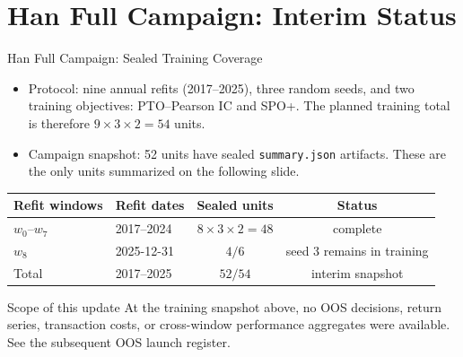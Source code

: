 \documentclass[aspectratio=169,xcolor=dvipsnames]{beamer}
\begin{document}
    

\section{Han Full Campaign: Interim Status}

\begin{frame}
    \tableofcontents[currentsection]
\end{frame}

\begin{frame}{Han Full Campaign: Sealed Training Coverage}
    \small
    \begin{itemize}
        \item Protocol: nine annual refits (2017--2025), three random seeds,
        and two training objectives: PTO--Pearson IC and SPO+.
        The planned training total is therefore $9\times3\times2=54$ units.
        \item Campaign snapshot: 52 units have sealed \texttt{summary.json}
        artifacts. These are the only units summarized on the following slide.
    \end{itemize}
    \vspace{3pt}
    \begin{table}
        \centering
        \footnotesize
        \setlength{\tabcolsep}{5pt}
        \begin{tabular}{l l c c}
            \toprule
            \textbf{Refit windows} & \textbf{Refit dates} & \textbf{Sealed units} & \textbf{Status} \\
            \midrule
            $w_0$--$w_7$ & 2017--2024 & $8\times3\times2=48$ & complete \\
            $w_8$ & 2025-12-31 & $4/6$ & seed 3 remains in training \\
            \midrule
            Total & 2017--2025 & $52/54$ & interim snapshot \\
            \bottomrule
        \end{tabular}
    \end{table}
    \vspace{3pt}
    \begin{alertblock}{Scope of this update}
    At the training snapshot above, no OOS decisions, return series, transaction costs, or cross-window
    performance aggregates were available. See the subsequent OOS launch register.
    \end{alertblock}
\end{frame}
\end{document}
